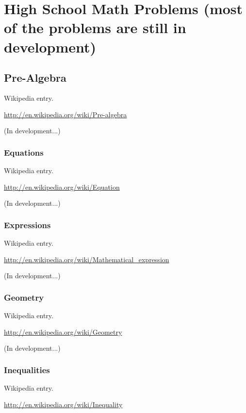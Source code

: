 \documentclass[12pt,oneside]{book}
\begin{document}
\chapter[High School Math Problems]{High School Math Problems (most of the problems are still in development)}

\section[Pre{}-Algebra]{Pre{}-Algebra}

Wikipedia entry.

\href{http://en.wikipedia.org/wiki/Pre-algebra}{http://en.wikipedia.org/wiki/Pre{}-algebra}

(In development...)

\subsection[Equations]{Equations}

Wikipedia entry.

\href{http://en.wikipedia.org/wiki/Equation}{http://en.wikipedia.org/wiki/Equation}

(In development...)

\subsection[Expressions]{Expressions}

Wikipedia entry.

\href{http://en.wikipedia.org/wiki/Mathematical_expression}{http://en.wikipedia.org/wiki/Mathematical\_expression}

(In development...)

\subsection[Geometry]{Geometry}

Wikipedia entry.

\href{http://en.wikipedia.org/wiki/Geometry}{http://en.wikipedia.org/wiki/Geometry}

(In development...)

\subsection[Inequalities]{Inequalities}

Wikipedia entry.

\href{http://en.wikipedia.org/wiki/Inequality}{http://en.wikipedia.org/wiki/Inequality}
\end{document}

